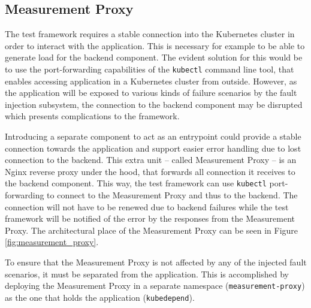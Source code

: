 \subsection{Measurement Proxy}

The test framework requires a stable connection into the Kubernetes cluster in order to interact with the application. This is necessary for example to be able to generate load for the backend component. The evident solution for this would be to use the port-forwarding capabilities of the \texttt{kubectl} command line tool, that enables accessing application in a Kubernetes cluster from outside. However, as the application will be exposed to various kinds of failure scenarios by the fault injection subsystem, the connection to the backend component may be disrupted which presents complications to the framework.

Introducing a separate component to act as an entrypoint could provide a stable connection towards the application and support easier error handling due to lost connection to the backend. This extra unit -- called Measurement Proxy -- is an Nginx reverse proxy under the hood, that forwards all connection it receives to the backend component. This way, the test framework can use \texttt{kubectl} port-forwarding to connect to the Measurement Proxy and thus to the backend. The connection will not have to be renewed due to backend failures while the test framework will be notified of the error by the responses from the Measurement Proxy. The architectural place of the Measurement Proxy can be seen in Figure \ref{fig:measurement_proxy}.

To ensure that the Measurement Proxy is not affected by any of the injected fault scenarios, it must be separated from the application. This is accomplished by deploying the Measurement Proxy in a separate namespace (\texttt{measurement-proxy}) as the one that holds the application (\texttt{kubedepend}).


